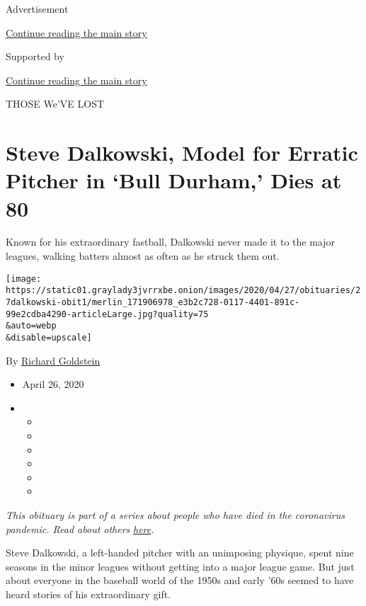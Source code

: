 Advertisement

\protect\hyperlink{after-top}{Continue reading the main story}

Supported by

\protect\hyperlink{after-sponsor}{Continue reading the main story}

THOSE We'VE LOST

\hypertarget{steve-dalkowski-model-for-erratic-pitcher-in-bull-durham-dies-at-80}{%
\section{Steve Dalkowski, Model for Erratic Pitcher in `Bull Durham,'
Dies at
80}\label{steve-dalkowski-model-for-erratic-pitcher-in-bull-durham-dies-at-80}}

Known for his extraordinary fastball, Dalkowski never made it to the
major leagues, walking batters almost as often as he struck them out.

\texttt{[image: https://static01.graylady3jvrrxbe.onion/images/2020/04/27/obituaries/27dalkowski-obit1/merlin\_171906978\_e3b2c728-0117-4401-891c-99e2cdba4290-articleLarge.jpg?quality=75\\\&auto=webp\\\&disable=upscale]}

By
\href{https://www.nytimes3xbfgragh.onion/by/richard-goldstein}{Richard
Goldstein}

\begin{itemize}
\item
  April 26, 2020
\item
  \begin{itemize}
  \item
  \item
  \item
  \item
  \item
  \item
  \end{itemize}
\end{itemize}

\emph{This obituary is part of a series about people who have died in
the coronavirus pandemic. Read about others}
\href{https://www.nytimes3xbfgragh.onion/series/people-who-have-died-of-the-coronavirus}{\emph{here}}\emph{.}

Steve Dalkowski, a left-handed pitcher with an unimposing physique,
spent nine seasons in the minor leagues without getting into a major
league game. But just about everyone in the baseball world of the 1950s
and early '60s seemed to have heard stories of his extraordinary gift.

